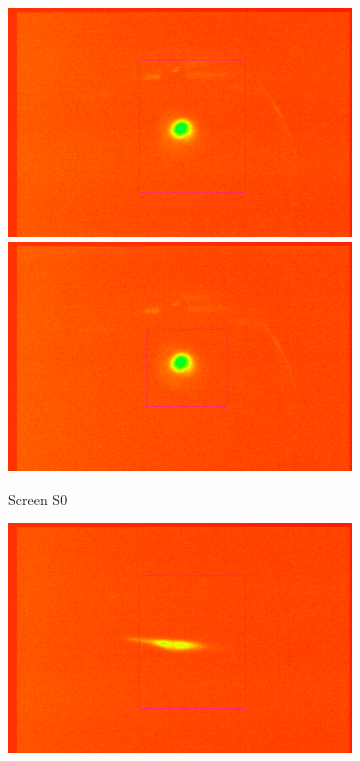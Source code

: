\documentclass[11pt,a4paper,notitlepage]{scrartcl}
\begin{document}
\begin{figure}[htbp]
	\begin{subfigure}{0.19\linewidth}
		\includegraphics[width=\linewidth]{figs/Screens/S0_Eyeball.png}
		\includegraphics[width=\linewidth]{figs/Screens/S0_Calib.png}
		\caption{Screen S0}
	\end{subfigure}	\hfill
	\begin{subfigure}{0.19\linewidth}
		\includegraphics[width=\linewidth]{figs/Screens/S1_Eyeball.png}

\end{subfigure}
\end{figure}
\end{document}

